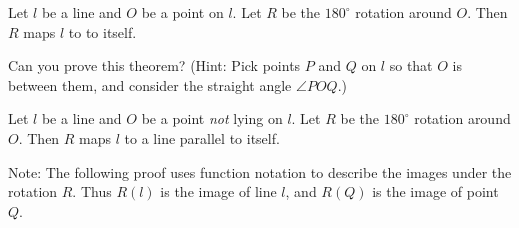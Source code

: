 \begin{theorem}
Let $l$ be a line and $O$ be a point on $l$. Let $R$ be the $180^\circ$
rotation around $O$. Then $R$ maps $l$ to to itself.  
\end{theorem}

\begin{question}
Can you prove this theorem?  
(Hint:  Pick points $P$ and $Q$ on $l$ so that $O$ is between them, and consider the straight angle $\angle POQ$.)
\end{question}
\QM

\begin{theorem}
Let $l$ be a line and $O$ be a point \emph{not} lying on $l$. Let $R$ be the $180^\circ$
rotation around $O$. Then $R$ maps $l$ to a line parallel to itself. 
\end{theorem}

Note:  The following proof uses function notation to describe the images under the rotation $R$.  Thus $R(l)$ is the image of line $l$, and $R(Q)$ is the image of point $Q$.  

